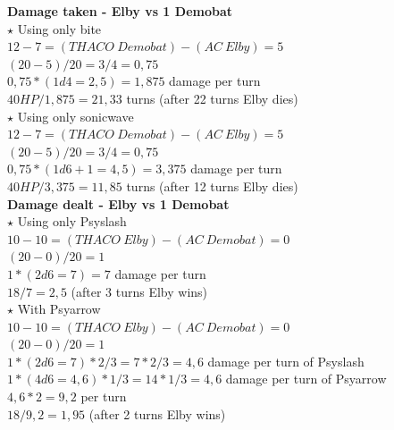 \vspace*{4mm}
\textbf{Damage taken - Elby vs 1 Demobat}\\
\newline
$\star$ Using only bite\\
$12-7 = (THACO\:Demobat) - (AC\:Elby) = 5$\\
$(20-5)/20 = 3/4 = 0,75$\\
$0,75 * (1d4 = 2,5) = 1,875$ damage per turn\\
$40 HP/ 1,875 = 21,33$ turns (after 22 turns Elby dies)\\
\newline
$\star$ Using only sonicwave\\
$12-7 = (THACO\:Demobat) - (AC\:Elby) = 5$\\
$(20-5)/20 = 3/4 = 0,75$\\
$0,75 * (1d6+1 = 4,5) = 3,375$ damage per turn\\
$40 HP/ 3,375 = 11,85$ turns (after 12 turns Elby dies)\\


\textbf{Damage dealt - Elby vs 1 Demobat}\\
\newline
$\star$ Using only Psyslash\\
$10-10 = (THACO\:Elby) - (AC\:Demobat) = 0$\\
$(20-0)/20 = 1$ \\
$1 * (2d6 = 7) = 7$ damage per turn\\
$18/ 7 =2,5$ (after 3 turns Elby wins)\\
\newline
$\star$ With Psyarrow\\
$10-10 = (THACO\:Elby) - (AC\:Demobat) = 0$\\
$(20-0)/20 = 1$ \\
$1 * (2d6 = 7) * 2/3  = 7 * 2/3 = 4,6$ damage per turn of Psyslash\\
$1 * (4d6 = 4,6) * 1/3 = 14 * 1/3  = 4,6$ damage per turn of Psyarrow\\
$4,6*2= 9,2$ per turn\\
$18 / 9,2 = 1,95$ (after 2 turns Elby wins)\\
\newpage

